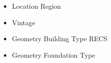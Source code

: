 \begin{itemize}
\item Location Region
\item Vintage
\item Geometry Building Type RECS
\item Geometry Foundation Type
\end{itemize}
